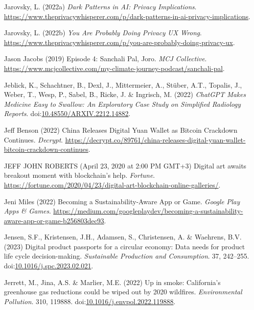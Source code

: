 \documentclass[
  letterpaper,
  DIV=11,
  numbers=noendperiod]{scrartcl}
\newlength{\cslhangindent}
\newenvironment{CSLReferences}[2] %
 {\begin{list}{}{%
  \setlength{\itemindent}{0pt}
  \setlength{\leftmargin}{0pt}
  \setlength{\parsep}{0pt}
  \ifodd #1
   \setlength{\leftmargin}{\cslhangindent}
   \setlength{\itemindent}{-1\cslhangindent}
  \fi
  \setlength{\itemsep}{#2\baselineskip}}}
 {\end{list}}
\begin{document}
\begin{CSLReferences}{0}{1}
Jarovsky, L. (2022a) \emph{Dark {Patterns} in {AI}: {Privacy
Implications}}.
\url{https://www.theprivacywhisperer.com/p/dark-patterns-in-ai-privacy-implications}.

Jarovsky, L. (2022b) \emph{You {Are Probably Doing Privacy UX Wrong}}.
\url{https://www.theprivacywhisperer.com/p/you-are-probably-doing-privacy-ux}.

Jason Jacobs (2019) Episode 4: {Sanchali Pal}, {Joro}. \emph{MCJ
Collective}.
\url{https://www.mcjcollective.com/my-climate-journey-podcast/sanchali-pal}.

Jeblick, K., Schachtner, B., Dexl, J., Mittermeier, A., Stüber, A.T.,
Topalis, J., Weber, T., Wesp, P., Sabel, B., Ricke, J. \& Ingrisch, M.
(2022) \emph{{ChatGPT Makes Medicine Easy} to {Swallow}: {An Exploratory
Case Study} on {Simplified Radiology Reports}}.
doi:\href{https://doi.org/10.48550/ARXIV.2212.14882}{10.48550/ARXIV.2212.14882}.

Jeff Benson (2022) China {Releases Digital Yuan Wallet} as {Bitcoin
Crackdown Continues}. \emph{Decrypt}.
\url{https://decrypt.co/89761/china-releases-digital-yuan-wallet-bitcoin-crackdown-continues}.

JEFF JOHN ROBERTS (April 23, 2020 at 2:00 PM GMT+3) Digital art awaits
breakout moment with blockchain's help. \emph{Fortune}.
\url{https://fortune.com/2020/04/23/digital-art-blockchain-online-galleries/}.

Jeni Miles (2022) Becoming a {Sustainability-Aware App} or {Game}.
\emph{Google Play Apps \& Games}.
\url{https://medium.com/googleplaydev/becoming-a-sustainability-aware-app-or-game-b256803dec93}.

Jensen, S.F., Kristensen, J.H., Adamsen, S., Christensen, A. \&
Waehrens, B.V. (2023) Digital product passports for a circular economy:
{Data} needs for product life cycle decision-making. \emph{Sustainable
Production and Consumption}. 37, 242--255.
doi:\href{https://doi.org/10.1016/j.spc.2023.02.021}{10.1016/j.spc.2023.02.021}.

Jerrett, M., Jina, A.S. \& Marlier, M.E. (2022) Up in smoke:
{California}'s greenhouse gas reductions could be wiped out by 2020
wildfires. \emph{Environmental Pollution}. 310, 119888.
doi:\href{https://doi.org/10.1016/j.envpol.2022.119888}{10.1016/j.envpol.2022.119888}.


\end{CSLReferences}
\end{document}
